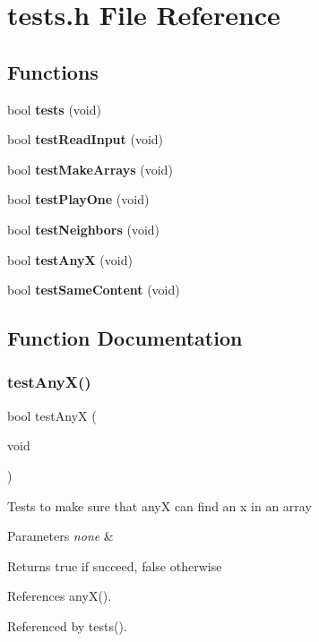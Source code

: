 \section{tests.\+h File Reference}
\label{tests_8h}
\subsection*{Functions}
\begin{DoxyCompactItemize}
\item 
bool \textbf{ tests} (void)
\item 
bool \textbf{ test\+Read\+Input} (void)
\item 
bool \textbf{ test\+Make\+Arrays} (void)
\item 
bool \textbf{ test\+Play\+One} (void)
\item 
bool \textbf{ test\+Neighbors} (void)
\item 
bool \textbf{ test\+AnyX} (void)
\item 
bool \textbf{ test\+Same\+Content} (void)
\end{DoxyCompactItemize}


\subsection{Function Documentation}
\mbox{\label{tests_8h_a9136792bde961164c06bcdde7ab1d5f5}} 
\subsubsection{test\+Any\+X()}
{\footnotesize\ttfamily bool test\+AnyX (\begin{DoxyParamCaption}\item[{void}]{ }\end{DoxyParamCaption})}

Tests to make sure that anyX can find an x in an array 
\begin{DoxyParams}{Parameters}
{\em none} & \\
\hline
\end{DoxyParams}
\begin{DoxyReturn}{Returns}
true if succeed, false otherwise 
\end{DoxyReturn}


References any\+X().



Referenced by tests().

